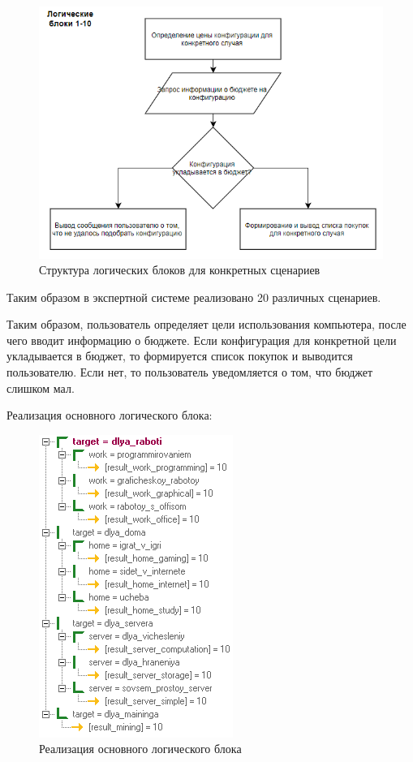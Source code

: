 \documentclass[14pt,a4paper,report]{report}
\begin{document}
\begin{figure}[h!]
	\centering
	\includegraphics[scale = 0.65]{images/0_2.png}
	\caption{Структура логических блоков для конкретных сценариев}
\end{figure}

Таким образом в экспертной системе реализовано 20 различных сценариев.

Таким образом, пользователь определяет цели использования компьютера, после чего вводит информацию о бюджете. Если конфигурация для конкретной цели укладывается в бюджет, то формируется список покупок и выводится пользователю. Если нет, то пользователь уведомляется о том, что бюджет слишком мал.

Реализация основного логического блока:

\begin{figure}[h!]
	\centering
	\includegraphics[scale = 0.90]{images/1.png}
	\caption{Реализация основного логического блока}
\end{figure}
\end{document}

